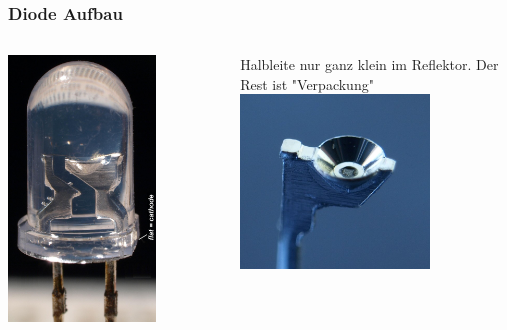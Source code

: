 \begin{frame}
    \frametitle{Diode Aufbau}
    \begin{columns}[c]
        \column[c]{5cm}
        \begin{center}
            \includegraphics[width=0.7\textwidth]{e12/Uvled_highres_macro.jpg}\\
            \tiny \hyperlink{refs}{\cite{wm}}
        \end{center}
        \column{5cm}
            Halbleite nur ganz klein im Reflektor. Der Rest ist "Verpackung"\\ 
            \includegraphics[width=0.7\textwidth]{e12/Led_reflector.jpg}
    \end{columns}
\end{frame}

